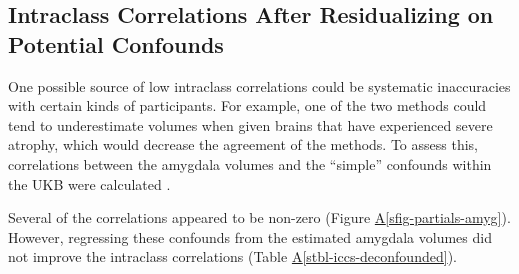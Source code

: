 \documentclass[
  authoryear,
  preprint,
  1p]{elsarticle}
\newcommand*\quartosfigref[1]{Figure \hyperref[#1]{A\ref{#1}}}
\newcommand*\quartostblref[1]{Table \hyperref[#1]{A\ref{#1}}}
\begin{document}
\FloatBarrier

\subsection{Intraclass Correlations After Residualizing on Potential
Confounds}\label{sec-confounds}

One possible source of low intraclass correlations could be systematic
inaccuracies with certain kinds of participants. For example, one of the
two methods could tend to underestimate volumes when given brains that
have experienced severe atrophy, which would decrease the agreement of
the methods. To assess this, correlations between the amygdala volumes
and the ``simple'' confounds within the UKB were calculated
\citep{alfaro-almagro2021}.

Several of the correlations appeared to be non-zero
(\quartosfigref{sfig-partials-amyg}). However, regressing these
confounds from the estimated amygdala volumes did not improve the
intraclass correlations (\quartostblref{stbl-iccs-deconfounded}).
\end{document}

